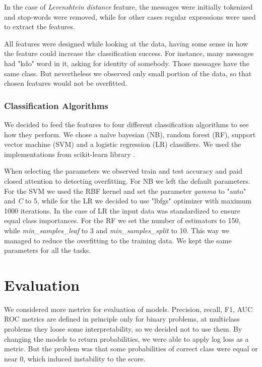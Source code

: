\documentclass[11pt,a4paper]{article}
\begin{document}
In the case of \textit{Levenshtein distance} feature,  the messages were initially tokenized and stop-words \cite{sloStopWords} were removed, while for other cases regular expressions were used to extract the features.

All features were designed while looking at the data, having some sense in how the feature could increase the classification success. For instance, many messages  had "kdo" word in it, asking for identity of somebody. Those messages have the same class. But nevertheless we observed only small portion of the data, so that chosen features would not be overfitted.

\subsubsection{Classification Algorithms}
\label{sssc:class-alg}
We decided to feed the features to four different classification algorithms to see how they perform. We chose a na\^ive bayesian (NB), random forest (RF), support vector machine (SVM) and a logistic regression (LR) classifiers. We used the implementations from scikit-learn library \cite{scikit-learn}.

When selecting the parameters we observed train and test accuracy and paid closed attention to detecting overfitting. For NB we left the default parameters. For the SVM we used the RBF kernel and set the parameter \textit{gamma} to "auto" and \textit{C} to 5, while for the LR we decided to use "lbfgs" optimizer with maximum 1000 iterations. In the case of LR the input data was standardized to ensure equal class importances. For the RF we set the number of estimators to 150, while \textit{min\_samples\_leaf} to 3 and \textit{min\_samples\_split} to 10. This way we managed to reduce the overfitting to the training data. We kept the same parameters for all the tasks.

\section{Evaluation}
We considered more metrics for evaluation of models. Precision, recall, F1, AUC ROC metrics are defined in principle only for binary problems, at multiclass problems they loose some interpretability, so we decided not to use them. By changing the models to return probabilities, we were able to apply log loss as a metric. But the problem was that some probabilities of correct class were equal or near 0, which induced instability to the score.
\end{document}
